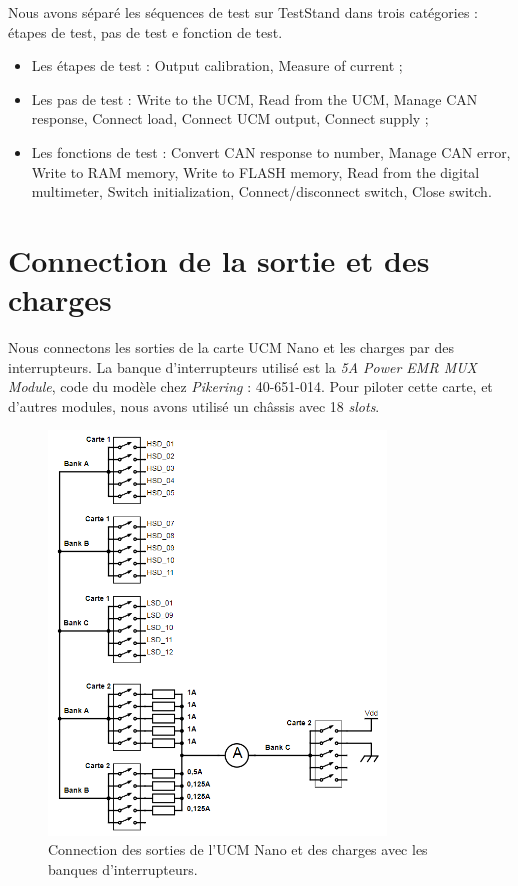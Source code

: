 Nous avons séparé les séquences de test sur TestStand dans trois catégories : étapes de test, pas de test e fonction de test. 


\begin{itemize}
\item Les étapes de test : 
\subitem Output calibration, 
\subitem Measure of current ;

\item Les pas de test : 
\subitem Write to the UCM, 
\subitem Read from the UCM, 
\subitem Manage CAN response, 
\subitem Connect load, 
\subitem Connect UCM output, 
\subitem Connect supply ;

\item Les fonctions de test : 
\subitem Convert CAN response to number, 
\subitem Manage CAN error, Write to RAM memory, 
\subitem Write to FLASH memory, 
\subitem Read from the digital multimeter, 
\subitem Switch initialization, 
\subitem Connect/disconnect switch, 
\subitem Close switch.
\end{itemize}
 



\section{Connection de la sortie et des charges}

Nous connectons les sorties de la carte UCM Nano et les charges par des interrupteurs. La banque d'interrupteurs utilisé est la \textit{5A Power EMR MUX Module}, code du modèle chez \emph{Pikering} : 40-651-014. Pour piloter cette carte, et d'autres modules, nous avons utilisé un châssis avec 18 \textit{slots}.


\begin{figure}[H]
    \centering
    \includegraphics[width=0.80\textwidth]{images/switches-carte1-2}
    \caption{Connection des sorties de l'UCM Nano et des charges avec les banques d'interrupteurs.}
    \label{fig:switches-carte1-2}
\end{figure}


